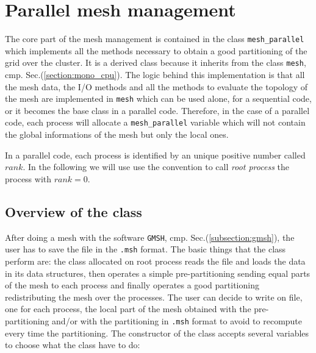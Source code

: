 \section{Parallel mesh management}\label{section:multi_CPUs}
The core part of the mesh management is contained in the class \verb|mesh_parallel| which implements all the methods necessary to obtain a good partitioning of the grid over the cluster. It is a derived class because it inherits from the class \verb|mesh|, cmp. Sec.(\ref{section:mono_cpu}). The logic behind this implementation is that all the mesh data, the I/O methods and all the methods to evaluate the topology of the mesh are implemented in \verb|mesh| which can be used alone, for a sequential code, or it becomes the base class in a parallel code. Therefore, in the case of a parallel code, each process will allocate a \verb|mesh_parallel| variable which will not contain the global informations of the mesh but only the local ones.
\medskip

In a parallel code, each process is identified by an unique positive number called $rank$. In the following we will use use the convention to call \textit{root process} the process with $rank=0$.

\subsection{Overview of the class}\label{subsection:multi_CPU_overview}
After doing a mesh with the software \verb|GMSH|, cmp. Sec.(\ref{subsection:gmsh}), the user has to save the file in the \verb|.msh| format. The basic things that the class perform are: the class allocated on root process reads the file and loads the data in its data structures, then operates a simple pre-partitioning sending equal parts of the mesh to each process and finally operates a good partitioning redistributing the mesh over the processes. The user can decide to write on file, one for each process, the local part of the mesh obtained with the pre-partitioning and/or with the partitioning in \verb|.msh| format to avoid to recompute every time the partitioning. The constructor of the class accepts several variables to choose what the class have to do:

